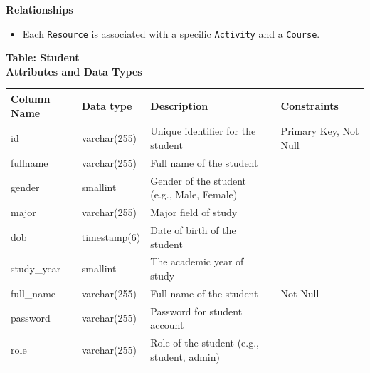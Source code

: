 \documentclass[12pt]{article}
\begin{document}
\noindent
\textbf{Relationships}
\begin{itemize}
    \item Each \texttt{Resource} is associated with a specific \texttt{Activity} and a \texttt{Course}.
\end{itemize}

\pagebreak

\textbf{Table: Student} \\

\textbf{Attributes and Data Types}
\begin{table}[H]
    \centering
    \renewcommand{\arraystretch}{1.5}
    \begin{tabular}{|l|l|p{4.5cm}|l|}
    \hline
    \rowcolor[HTML]{96FFFB} 
    \textbf{Column Name} & \textbf{Data type}        & \textbf{Description}                                   & \textbf{Constraints}             \\ \hline
    id                   & varchar(255)             & Unique identifier for the student                      & Primary Key, Not Null            \\ \hline
    fullname             & varchar(255)             & Full name of the student                               &                                 \\ \hline
    gender               & smallint                 & Gender of the student (e.g., Male, Female)             &                                 \\ \hline
    major                & varchar(255)             & Major field of study                                  &                                 \\ \hline
    dob                  & timestamp(6)             & Date of birth of the student                           &                                 \\ \hline
    study\_year          & smallint                 & The academic year of study                             &                                 \\ \hline
    full\_name           & varchar(255)             & Full name of the student                               & Not Null                        \\ \hline
    password             & varchar(255)             & Password for student account                           &                                 \\ \hline
    role                 & varchar(255)             & Role of the student (e.g., student, admin)             &                                 \\ \hline

\end{tabular}
\end{table}
\end{document}
